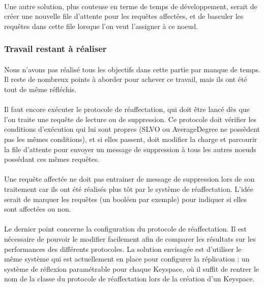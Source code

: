 \documentclass[12pt]{article}
\begin{document}
\paragraph{}Une autre solution, plus couteuse en terme de temps de développement, serait de créer une nouvelle file d'attente pour les requêtes affectées, et de basculer les requêtes dans cette file lorsque l'on veut l'assigner à ce noeud.

\subsubsection*{Travail restant à réaliser}

\paragraph{}Nous n'avons pas réalisé tous les objectifs dans cette partie par manque de temps. Il reste de nombreux points à aborder pour achever ce travail, mais ils ont été tout de même réfléchis.

\paragraph{}Il faut encore exécuter le protocole de réaffectation, qui doit être lancé dès que l'on traite une requête de lecture ou de suppression. Ce protocole doit vérifier les conditions d'exécution qui lui sont propres (SLVO ou AverageDegree ne possèdent pas les mêmes conditions), et si elles passent, doit modifier la charge et parcourir la file d'attente pour envoyer un message de suppression à tous les autres noeuds possédant ces mêmes requêtes.

\paragraph{}Une requête affectée ne doit pas entrainer de message de suppression lors de son traitement car ils ont été réalisés plus tôt par le système de réaffectation. L'idée serait de marquer les requêtes (un booléen par exemple) pour indiquer si elles sont affectées ou non.

\paragraph{}Le dernier point concerne la configuration du protocole de réaffectation. Il est nécessaire de pouvoir le modifier facilement afin de comparer les résultats sur les performances des différents protocoles. La solution envisagée est d'utiliser le même système qui est actuellement en place pour configurer la réplication : un système de réflexion paramétrable pour chaque Keyspace, où il suffit de rentrer le nom de la classe du protocole de réaffectation lors de la création d'un Keyspace.
\end{document}
